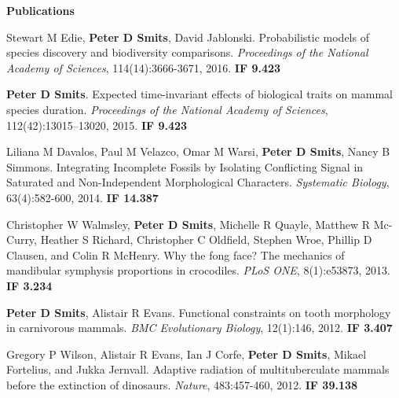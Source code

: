 \documentclass[letterpaper,11pt]{article}
\newcommand{\resheading}[1]{{\large \colorbox{mygrey}{\begin{minipage}{\textwidth}{\textbf{#1 \vphantom{p\^{E}}}}\end{minipage}}}}
\begin{document}
\resheading{Publications}
  \begin{description}
    \item Stewart M Edie, {\bf Peter D Smits}, David Jablonski. Probabilistic models of species discovery and biodiversity comparisons. \emph{Proceedings of the National Academy of Sciences}, 114(14):3666-3671, 2016. {\bf IF 9.423}
    \item {\bf Peter D Smits}. Expected time-invariant effects of biological traits on mammal species duration. \emph{Proceedings of the National Academy of Sciences}, 112(42):13015–13020, 2015. {\bf IF 9.423}
    \item Liliana M Davalos, Paul M Velazco, Omar M Warsi, {\bf Peter D Smits}, Nancy B Simmons. Integrating Incomplete Fossils by Isolating Conflicting Signal in Saturated and Non-Independent Morphological Characters. \emph{Systematic Biology}, 63(4):582-600, 2014. {\bf IF 14.387}
    \item Christopher W Walmsley, {\bf Peter D Smits}, Michelle R Quayle, Matthew R Mc-Curry, Heather S Richard, Christopher C Oldfield, Stephen Wroe, Phillip D Clausen, and Colin R McHenry. Why the fong face? The mechanics of mandibular symphysis proportions in crocodiles. \emph{PLoS ONE}, 8(1):e53873, 2013. {\bf IF 3.234}
    \item {\bf Peter D Smits}, Alistair R Evans. Functional constraints on tooth morphology in carnivorous mammals. \emph{BMC Evolutionary Biology}, 12(1):146, 2012. {\bf IF 3.407}
    \item Gregory P Wilson, Alistair R Evans, Ian J Corfe, {\bf Peter D Smits}, Mikael Fortelius, and Jukka Jernvall. Adaptive radiation of multituberculate mammals before the extinction of dinosaurs. \emph{Nature}, 483:457-460, 2012. {\bf IF 39.138}
  \end{description}

\end{document}
